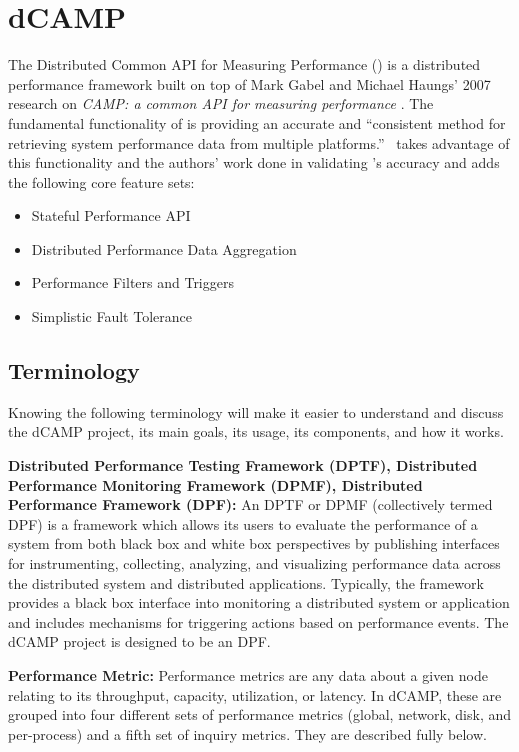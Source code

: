 \chapter{dCAMP}
\label{dcamp}

The Distributed Common API for Measuring Performance (\dcamp) is a distributed performance framework built on top of Mark Gabel and Michael Haungs' 2007 research on \emph{CAMP: a common API for measuring performance} \cite{gabel2007}. The fundamental functionality of \camp is providing an accurate and ``consistent method for retrieving system performance data from multiple platforms.'' \dcamp\ takes advantage of this functionality and the authors' work done in validating \camp's accuracy and adds the following core feature sets:
\begin{itemize}
\item Stateful Performance API
\item Distributed Performance Data Aggregation
\item Performance Filters and Triggers
\item Simplistic Fault Tolerance
\end{itemize}

\section{Terminology}
Knowing the following terminology will make it easier to understand and discuss the dCAMP project, its main goals, its usage, its components, and how it works. 

\textbf{Distributed Performance Testing Framework (DPTF), Distributed Performance Monitoring Framework (DPMF), Distributed Performance Framework (DPF):} An DPTF or DPMF (collectively termed DPF) is a framework which allows its users to evaluate the performance of a system from both black box and white box perspectives by publishing interfaces for instrumenting, collecting, analyzing, and visualizing performance data across the distributed system and distributed applications. Typically, the framework provides a black box interface into monitoring a distributed system or application and includes mechanisms for triggering actions based on performance events. The dCAMP project is designed to be an DPF. 

\textbf{Performance Metric:} Performance metrics are any data about a given node relating to its throughput, capacity, utilization, or latency. In dCAMP, these are grouped into four different sets of performance metrics (global, network, disk, and per-process) and a fifth set of inquiry metrics. They are described fully below. 

